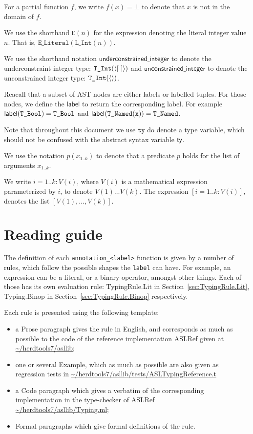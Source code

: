 \documentclass{book}
\newcommand\astlabel[0]{\textsf{label}}
\newcommand\underconstrainedinteger[0]{\textsf{underconstrained\_integer}}
\newcommand\unconstrainedinteger[0]{\textsf{unconstrained\_integer}}
\newcommand\tty[0]{\texttt{ty}}
\begin{document}
For a partial function $f$, we write $f(x) = \bot$ to denote that $x$ is not in the domain of $f$.

\newcommand\Elit[1]{\texttt{E}(#1)}
We use the shorthand $\Elit{n}$ for the expression denoting the literal integer value $n$. That is, $\texttt{E\_Literal}(\texttt{L\_Int}(n))$.

We use the shorthand notation $\underconstrainedinteger$ to denote the underconstraint integer type: $\texttt{T\_Int}(\langle[\ ]\rangle)$
and $\unconstrainedinteger$ to denote the unconstrained integer type: $\texttt{T\_Int}(\langle\rangle)$.

Reacall that a subset of AST nodes are either labels or labelled tuples.
For those nodes, we define the $\astlabel$ to return the corresponding label.
For example $\astlabel(\TBool) = \TBool$ and $\astlabel(\TNamed(\texttt{x})) = \TNamed$.

Note that throughout this document we use $\tty$ do denote a type variable, which should not be confused with the abstract syntax variable $\textsf{ty}$.

We use the notation $p(x_{1..k})$ to denote that a predicate $p$ holds for the list of arguments $x_{1..k}$.

We write $i=1..k: V(i)$, where $V(i)$ is a mathematical expression parameterized by $i$, to denote $V(1) \ldots V(k)$.
The expression $[i=1..k: V(i)]$, denotes the list $[V(1),\ldots,V(k)]$.

\chapter{Reading guide}

The definition of each \texttt{annotation\_<label>} function is given by a number of
rules, which follow the possible shapes the \texttt{label} can have. For
example, an expression can be a literal, or a binary operator, amongst other
things. Each of those has its own evaluation rule: TypingRule.Lit in
Section~\ref{sec:TypingRule.Lit}, Typing.Binop in
Section~\ref{sec:TypingRule.Binop} respectively.

Each rule is presented using the following template:
\begin{itemize}
\item a Prose paragraph gives the rule in English, and corresponds as much as possible to the code of the reference implementation ASLRef given at \url{~/herdtools7/asllib};
\item one or several Example, which as much as possible are also given as regression tests in \url{~/herdtools7/asllib/tests/ASLTypingReference.t}
\item a Code paragraph which gives a verbatim of the corresponding implementation in the type-checker of ASLRef \url{~/herdtools7/asllib/Typing.ml};
\item Formal paragraphs which give formal definitions of the rule.
\end{itemize}
\end{document}
